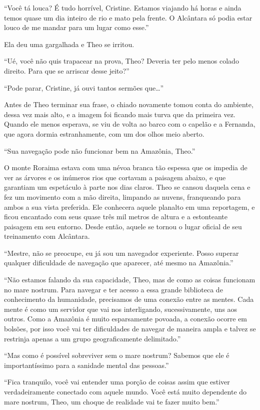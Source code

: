 ``Você tá louca? É tudo horrível, Cristine. Estamos viajando há horas e
ainda temos quase um dia inteiro de rio e mato pela frente. O Alcântara
só podia estar louco de me mandar para um lugar como esse.''

Ela deu uma gargalhada e Theo se irritou.

``Ué, você não quis trapacear na prova, Theo? Deveria ter pelo menos
colado direito. Para que se arriscar desse jeito?''

``Pode parar, Cristine, já ouvi tantos sermões que\ldots{}''

Antes de Theo terminar sua frase, o chiado novamente tomou conta do
ambiente, dessa vez mais alto, e a imagem foi ficando mais turva que da
primeira vez. Quando ele menos esperava, se viu de volta ao barco com o
capelão e a Fernanda, que agora dormia estranhamente, com um dos olhos
meio aberto.

\asterisc

``Sua navegação pode não funcionar bem na Amazônia, Theo.''

O monte Roraima estava com uma névoa branca tão espessa que os impedia
de ver as árvores e os inúmeros rios que cortavam a paisagem abaixo, e
que garantiam um espetáculo à parte nos dias claros. Theo se cansou
daquela cena e fez um movimento com a mão direita, limpando as nuvens,
franqueando para ambos a sua vista preferida. Ele conhecera aquele
planalto em uma reportagem, e ficou encantado com seus quase três mil
metros de altura e a estonteante paisagem em seu entorno. Desde então,
aquele se tornou o lugar oficial de seu treinamento com Alcântara.

``Mestre, não se preocupe, eu já sou um navegador experiente. Posso
superar qualquer dificuldade de navegação que aparecer, até mesmo na
Amazônia.''

``Não estamos falando da sua capacidade, Theo, mas de como as coisas
funcionam no mare nostrum. Para navegar e ter acesso a essa grande
biblioteca de conhecimento da humanidade, precisamos de uma conexão entre
as mentes. Cada mente é como um servidor que vai nos interligando,
sucessivamente, uns aos outros. Como a Amazônia é muito esparsamente
povoada, a conexão ocorre em bolsões, por isso você vai ter dificuldades
de navegar de maneira ampla e talvez se restrinja apenas a um grupo
geograficamente delimitado.''

``Mas como é possível sobreviver sem o mare nostrum? Sabemos que ele é
importantíssimo para a sanidade mental das pessoas.''

``Fica tranquilo, você vai entender uma porção de coisas assim que
estiver verdadeiramente conectado com aquele mundo. Você está muito
dependente do mare nostrum, Theo, um choque de realidade vai te fazer
muito bem.''

